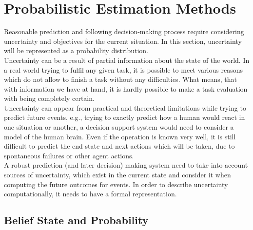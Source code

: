 \section{Probabilistic Estimation Methods}

Reasonable prediction and following decision-making process require considering uncertainty and objectives for the current situation. In this section, uncertainty will be represented as a probability distribution. \\
Uncertainty can be a result of partial information about the state of the world. In a real world trying to fulfil any given task, it is possible to meet various reasons which do not allow to finish a task without any difficulties. What means, that with information we have at hand, it is hardly possible to make a task evaluation with being completely certain. \\
Uncertainty can appear from practical and theoretical limitations while trying to predict future events, e.g., trying to exactly predict how a human would react in one situation or another, a decision support system would need to consider a model of the human brain. Even if the operation is known very well, it is still difficult to predict the end state and next actions which will be taken, due to spontaneous failures or other agent actions. \\
A robust prediction (and later decision) making system need to take into account sources of uncertainty, which exist in the current state and consider it when computing the future outcomes for events. In order to describe uncertainty
computationally, it needs to have a formal representation. 

\subsection{Belief State and Probability}

